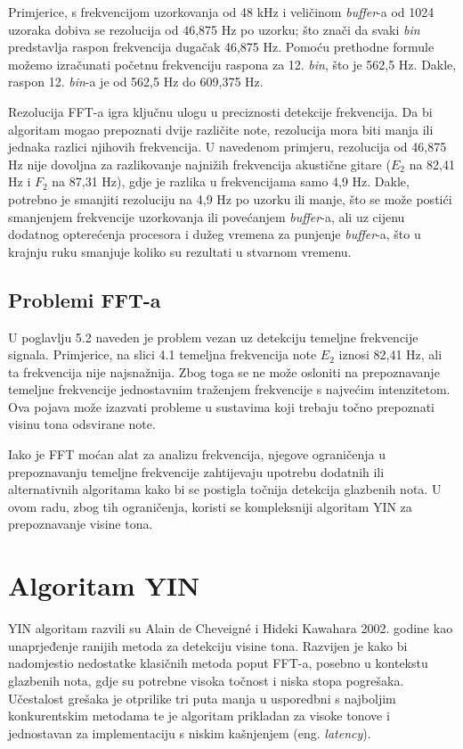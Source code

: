 \documentclass[times, utf8, diplomski, numeric]{fer}
\begin{document}
Primjerice, s frekvencijom uzorkovanja od 48 kHz i veličinom \textit{buffer}-a od 1024 uzoraka dobiva se rezolucija od 46,875 Hz po uzorku; što znači da svaki \textit{bin} predstavlja raspon frekvencija dugačak 46,875 Hz. Pomoću prethodne formule možemo izračunati početnu frekvenciju raspona za 12. \textit{bin}, što je 562,5 Hz. Dakle, raspon 12. \textit{bin}-a je od 562,5 Hz do 609,375 Hz.

Rezolucija FFT-a igra ključnu ulogu u preciznosti detekcije frekvencija. Da bi algoritam mogao prepoznati dvije različite note, rezolucija mora biti manja ili jednaka razlici njihovih frekvencija. U navedenom primjeru, rezolucija od 46,875 Hz nije dovoljna za razlikovanje najnižih frekvencija akustične gitare ($E_2$ na 82,41 Hz i $F_2$ na 87,31 Hz), gdje je razlika u frekvencijama samo 4,9 Hz. Dakle, potrebno je smanjiti rezoluciju na 4,9 Hz po uzorku ili manje, što se može postići smanjenjem frekvencije uzorkovanja ili povećanjem \textit{buffer}-a, ali uz cijenu dodatnog opterećenja procesora i dužeg vremena za punjenje \textit{buffer}-a, što u krajnju ruku smanjuje koliko su rezultati u stvarnom vremenu.

\section{Problemi FFT-a}
U poglavlju 5.2 naveden je problem vezan uz detekciju temeljne frekvencije signala. Primjerice, na slici 4.1 temeljna frekvencija note $E_2$ iznosi 82,41 Hz, ali ta frekvencija nije najsnažnija. Zbog toga se ne može osloniti na prepoznavanje temeljne frekvencije jednostavnim traženjem frekvencije s najvećim intenzitetom. Ova pojava može izazvati probleme u sustavima koji trebaju točno prepoznati visinu tona odsvirane note.

Iako je FFT moćan alat za analizu frekvencija, njegove ograničenja u prepoznavanju temeljne frekvencije zahtijevaju upotrebu dodatnih ili alternativnih algoritama kako bi se postigla točnija detekcija glazbenih nota. U ovom radu, zbog tih ograničenja, koristi se kompleksniji algoritam YIN za prepoznavanje visine tona.

\chapter{Algoritam YIN\cite{de2002yin}}
%
YIN algoritam razvili su Alain de Cheveigné i Hideki Kawahara 2002. godine kao unaprjeđenje ranijih metoda za detekciju visine tona. Razvijen je kako bi nadomjestio nedostatke klasičnih metoda poput FFT-a, posebno u kontekstu glazbenih nota, gdje su potrebne visoka točnost i niska stopa pogrešaka. Učestalost grešaka je otprilike tri puta manja u usporedbni s najboljim konkurentskim metodama te je algoritam prikladan za visoke tonove i jednostavan za implementaciju s niskim kašnjenjem (eng. \textit{latency}).\cite{de2002yin}
\end{document}
